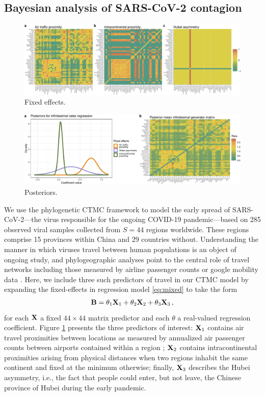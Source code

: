 \documentclass[12pt]{article} %
\begin{document}
\subsection{Bayesian analysis of SARS-CoV-2 contagion}\label{sec:sars}

\begin{figure}[!t]
	\centering
	\includegraphics[width=\linewidth]{fixedEffects.pdf}
	\caption{Fixed effects.}\label{fig:FE}
\end{figure}

\begin{figure}[!t]
	\centering
	\includegraphics[width=\linewidth]{postViz.pdf}
	\caption{Posteriors.}\label{fig:post}
\end{figure}

We use the phylogenetic CTMC framework to model the early spread of SARS-CoV-2---the virus responsible for the ongoing COVID-19 pandemic---based on 285 observed viral samples collected from $S=44$ regions worldwide. These regions comprise 15 provinces within China and 29 countries without.  Understanding the manner in which viruses travel between human populations is an object of ongoing study, and phylogeographic analyses point to the central role of travel networks including those measured by airline passenger counts \citep{holbrook2021massive} or google mobility data \citep{worobey2020emergence}.  Here, we include three such predictors of travel in our CTMC model by expanding the fixed-effects in regression model \eqref{eq:mixed} to take the form
\begin{align*}
	\mathbf{B} = \theta_1 \mathbf{X}_1 + \theta_2  \mathbf{X}_2 + \theta_3 \mathbf{X}_3 \, ,
\end{align*} 
for each $\mathbf{X}$ a fixed $44\times 44$ matrix predictor and each $\theta$ a real-valued regression coefficient. Figure \ref{fig:FE} presents the three predictors of interest: $\mathbf{X}_1$ contains air travel proximities between locations as measured by annualized air passenger counts between airports contained within a region \citep{holbrook2021massive};  $\mathbf{X}_2$ contains intracontinental proximities arising from physical distances when two regions inhabit the same continent and fixed at the minimum otherwise; finally, $\mathbf{X}_3$ describes the Hubei asymmetry, i.e., the fact that people could enter, but not leave, the Chinese province of Hubei during the early pandemic.
\end{document}
